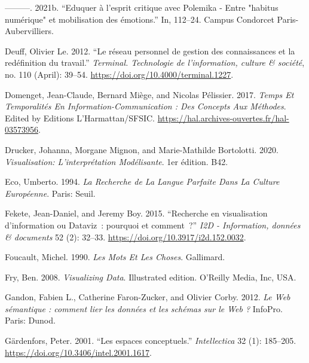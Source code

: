 \documentclass[
  letterpaper,
  DIV=11,
  numbers=noendperiod]{scrreprt}
\newlength{\cslhangindent}
\newlength{\cslentryspacingunit} %
\newenvironment{CSLReferences}[2] %
 {%
  \setlength{\parindent}{0pt}
  \ifodd #1
  \let\oldpar\par
  \def\par{\hangindent=\cslhangindent\oldpar}
  \fi
  \setlength{\parskip}{#2\cslentryspacingunit}
 }%
 {}
\begin{document}
\begin{CSLReferences}{1}{0}
\leavevmode{}%
---------. 2021b. {``Eduquer à l'esprit critique avec Polemika - Entre
{"}habitus numérique{"} et mobilisation des émotions.''} In, 112--24.
Campus Condorcet Paris-Aubervilliers.

\leavevmode{}%
Deuff, Olivier Le. 2012. {``Le réseau personnel de gestion des
connaissances et la redéfinition du travail.''} \emph{Terminal.
Technologie de l'information, culture \& société}, no. 110 (April):
39--54. \url{https://doi.org/10.4000/terminal.1227}.

\leavevmode{}%
Domenget, Jean-Claude, Bernard Miège, and Nicolas Pélissier. 2017.
\emph{Temps Et Temporalités En Information-Communication : Des Concepts
Aux Méthodes}. Edited by Editions L'Harmattan/SFSIC.
\url{https://hal.archives-ouvertes.fr/hal-03573956}.

\leavevmode{}%
Drucker, Johanna, Morgane Mignon, and Marie-Mathilde Bortolotti. 2020.
\emph{Visualisation: L'interprétation Modélisante}. 1er édition. B42.

\leavevmode{}%
Eco, Umberto. 1994. \emph{La Recherche de La Langue Parfaite Dans La
Culture Européenne}. Paris: Seuil.

\leavevmode{}%
Fekete, Jean-Daniel, and Jeremy Boy. 2015. {``Recherche en visualisation
d{'}information ou Dataviz~: pourquoi et comment~?''} \emph{I2D -
Information, données \& documents} 52 (2): 32--33.
\url{https://doi.org/10.3917/i2d.152.0032}.

\leavevmode{}%
Foucault, Michel. 1990. \emph{Les Mots Et Les Choses}. Gallimard.

\leavevmode{}%
Fry, Ben. 2008. \emph{Visualizing Data}. Illustrated edition. O'Reilly
Media, Inc, USA.

\leavevmode{}%
Gandon, Fabien L., Catherine Faron-Zucker, and Olivier Corby. 2012.
\emph{Le Web sémantique : comment lier les données et les schémas sur le
Web ?} InfoPro. Paris: Dunod.

\leavevmode{}%
Gärdenfors, Peter. 2001. {``Les espaces conceptuels.''}
\emph{Intellectica} 32 (1): 185--205.
\url{https://doi.org/10.3406/intel.2001.1617}.


\end{CSLReferences}
\end{document}
